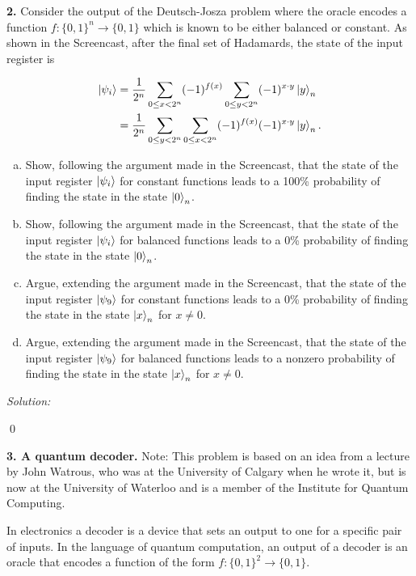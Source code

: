 \documentclass{book}
\theoremstyle{definition}
\newcommand{\nn}{\nonumber}
\newcommand{\f}[2]{\frac{#1}{#2}}
\begin{document}
\newpage



\noindent \textbf{2.} Consider the output of the Deutsch-Josza problem where the oracle encodes a function $f : \{0, 1\}^n \to \{0, 1\}$ which is known to be either balanced or constant. As shown in the Screencast, after the final set of Hadamards, the state of the input register
is

\begin{align}
\ket{\psi_i} &= \f{1}{2^n}\sum_{0 \leq x < 2^n} (-1)^{f(x)} \sum_{0\leq y < 2^n} (-1)^{x\cdot y} \ket{y}_n \nn\\&= \f{1}{2^n} \sum_{0\leq y < 2^n} \sum_{0\leq x < 2^n}(-1)^{f(x)}(-1)^{x\cdot y}\ket{y}_n.
\end{align}
\begin{enumerate}[(a)]
	\item Show, following the argument made in the Screencast, that the state of the input register $\ket{\psi_i}$ for constant functions leads to a 100\% probability of finding the state in the state $\ket{0}_n$.
	
	\item Show, following the argument made in the Screencast, that the state of the input register $\ket{\psi_i}$ for balanced functions leads to a 0\% probability of finding the state in the state $\ket{0}_n$.
	
	\item Argue, extending the argument made in the Screencast, that the state of the input
	register $\ket{\psi_9}$ for constant functions leads to a 0\% probability of finding the state in the state $\ket{x}_n$ for $x \neq 0$.
	
	\item Argue, extending the argument made in the Screencast, that the state of the input
	register $\ket{\psi_9}$ for balanced functions leads to a nonzero probability of finding the state in the state $\ket{x}_n$ for $x \neq 0$.
\end{enumerate}

\noindent \textit{Solution:}


\qed


\newpage


\noindent \textbf{3. A quantum decoder.}  Note: This problem is based on an idea from a lecture by John Watrous, who was at the University of Calgary when he wrote it, but is now at the University of Waterloo and is a member of the Institute for Quantum Computing.


In electronics a decoder is a device that sets an output to one for a specific pair of inputs. In the language of quantum computation, an output of a decoder is an oracle that encodes a function of the form $f : \{0, 1\}^2 \to \{0, 1\}$. 
\end{document}
